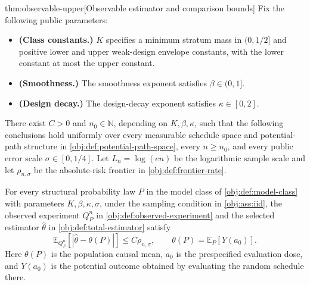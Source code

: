 \documentclass[11pt]{article}
\begin{document}
\begin{theoremv}{thm:observable-upper}[Observable estimator and comparison bounds]
Fix the following public parameters:
\begin{itemize}
\item \textbf{(Class constants.)} \(K\) specifies a minimum stratum mass in \((0,1/2]\) and positive lower and upper weak-design envelope constants, with the lower constant at most the upper constant.
\item \textbf{(Smoothness.)} The smoothness exponent satisfies \(\beta\in(0,1]\).
\item \textbf{(Design decay.)} The design-decay exponent satisfies \(\kappa\in[0,2]\).
\end{itemize}
There exist \(C>0\) and \(n_0\in\mathbb N\), depending on \(K,\beta,\kappa\), such that the following conclusions hold uniformly over every measurable schedule space and potential-path structure in \cref{obj:def:potential-path-space}, every \(n\ge n_0\), and every public error scale \(\sigma\in[0,1/4]\). Let \(L_n=\log(en)\) be the logarithmic sample scale and let \(\rho_{n,\sigma}\) be the absolute-risk frontier in \cref{obj:def:frontier-rate}.

For every structural probability law \(P\) in the model class of \cref{obj:def:model-class} with parameters \(K,\beta,\kappa,\sigma\), under the sampling condition in \cref{obj:ass:iid}, the observed experiment \(Q_P^n\) in \cref{obj:def:observed-experiment} and the selected estimator \(\widehat\theta\) in \cref{obj:def:total-estimator} satisfy
\[
\mathbb E_{Q_P^n}\!\left[
  \left|\widehat\theta-\theta(P)\right|
\right]
\le C\rho_{n,\sigma},
\qquad
\theta(P)=\mathbb E_P[Y(a_0)].
\]
Here \(\theta(P)\) is the population causal mean, \(a_0\) is the prespecified evaluation dose, and \(Y(a_0)\) is the potential outcome obtained by evaluating the random schedule there.


\end{theoremv}
\end{document}
